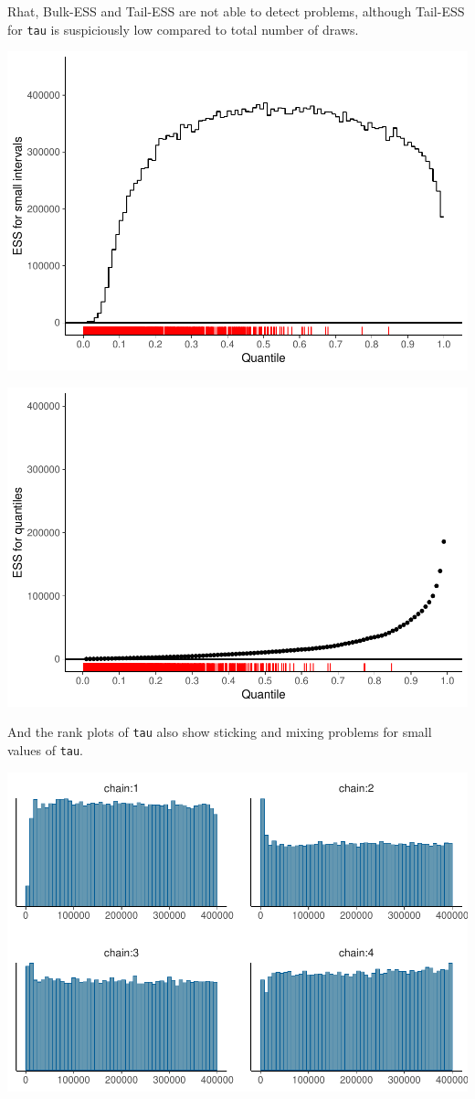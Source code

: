 \documentclass[american,]{article}
\begin{document}
Rhat, Bulk-ESS and Tail-ESS are not able to detect problems, although
Tail-ESS for \texttt{tau} is suspiciously low compared to total number
of draws.

\includegraphics{graphics/local-ess-fit-cp3-tau-1.pdf}

\includegraphics{graphics/quantile-ess-fit-cp3-tau-1.pdf}

And the rank plots of \texttt{tau} also show sticking and mixing
problems for small values of \texttt{tau}.

\includegraphics{graphics/hist-fit-cp3-tau-1.pdf}
\end{document}

